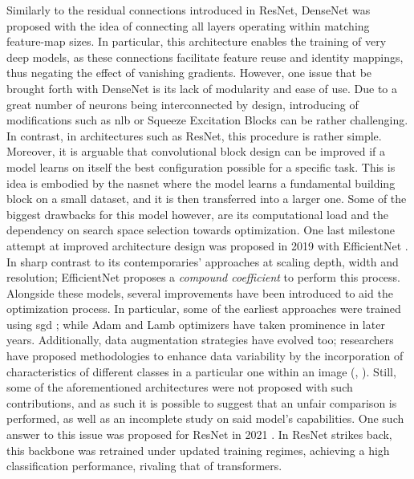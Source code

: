 \noindent Similarly to the residual connections introduced in ResNet, DenseNet 
\autocite{huang2017densely} was proposed with the idea of connecting all layers operating within 
matching feature-map sizes. In particular, this architecture enables the training of very deep 
models, as these connections facilitate feature reuse and identity mappings, thus negating the 
effect of vanishing gradients. However, one issue that be brought forth with DenseNet is its 
lack of  modularity and ease of use. Due to a great number of neurons being interconnected by 
design, introducing of modifications such as \gls{nlb}\autocite{wang2018non} or Squeeze Excitation 
Blocks  \autocite{hu2018squeeze} can be  rather challenging. In contrast, in architectures such as 
ResNet, this procedure is rather simple.\\

\noindent Moreover, it is arguable that convolutional block design can be improved if a model 
learns on itself the best configuration possible for a specific task. This is idea is embodied by 
the \gls{nasnet} \autocite{zoph2018learning} where the model learns a fundamental building block on a 
small dataset, and it is then transferred into a larger one. Some of the biggest drawbacks for this 
model however, are its computational load and the dependency on search space selection towards 
optimization. One last milestone attempt at improved architecture design was proposed in 2019 with 
EfficientNet \autocite{tan2019efficientnet}. In sharp contrast to its contemporaries' approaches at 
scaling depth, width and resolution; EfficientNet proposes a \emph{compound coefficient} to 
perform this process.\\

\noindent Alongside these models, several improvements have been introduced to aid the optimization 
process. In particular, some of the earliest approaches were trained using \gls{sgd} 
\autocite{bottou2010large}; while Adam \autocite{kingma2014adam} and Lamb \autocite{you2019large} 
optimizers have taken prominence in later years. Additionally, data augmentation strategies have 
evolved too; researchers have proposed methodologies to enhance data variability by the 
incorporation of characteristics of different classes in a particular one within an image 
(\cite{zhang2017mixup}, \cite{yun2019cutmix}). Still, some of the aforementioned architectures 
were not proposed with such contributions, and as such it is possible to suggest that an unfair 
comparison is performed, as well as an incomplete study on said model's capabilities. One such 
answer to this issue was proposed for ResNet in 2021 \autocite{wightman2021resnet}. In 
ResNet strikes back, this backbone was retrained under updated training regimes, achieving a 
high classification performance, rivaling that of transformers.\\

